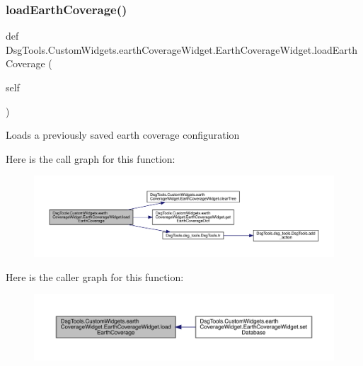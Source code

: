 \subsubsection{\texorpdfstring{load\+Earth\+Coverage()}{loadEarthCoverage()}}
{\footnotesize\ttfamily def Dsg\+Tools.\+Custom\+Widgets.\+earth\+Coverage\+Widget.\+Earth\+Coverage\+Widget.\+load\+Earth\+Coverage (\begin{DoxyParamCaption}\item[{}]{self }\end{DoxyParamCaption})}

\begin{DoxyVerb}Loads a previously saved earth coverage configuration
\end{DoxyVerb}
 Here is the call graph for this function\+:
\nopagebreak
\begin{figure}[H]
\begin{center}
\leavevmode
\includegraphics[width=350pt]{class_dsg_tools_1_1_custom_widgets_1_1earth_coverage_widget_1_1_earth_coverage_widget_a5b831b9c59fd2b0601fc53e17b1df56a_cgraph}
\end{center}
\end{figure}
Here is the caller graph for this function\+:
\nopagebreak
\begin{figure}[H]
\begin{center}
\leavevmode
\includegraphics[width=350pt]{class_dsg_tools_1_1_custom_widgets_1_1earth_coverage_widget_1_1_earth_coverage_widget_a5b831b9c59fd2b0601fc53e17b1df56a_icgraph}
\end{center}
\end{figure}
\mbox{\label{class_dsg_tools_1_1_custom_widgets_1_1earth_coverage_widget_1_1_earth_coverage_widget_a6dfd220814ce5df81f1220c2ba934443}} 
